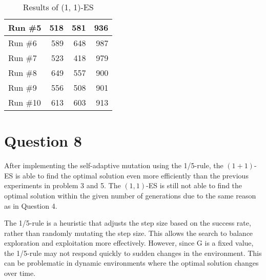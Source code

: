 \documentclass[12pt,letterpaper]{article}
\begin{document}
\begin{table}[H]
{\begin{tabular}{l|r|r|r}
            Run \#5  & 518      & 581     & 936     \\ \hline
            Run \#6  & 589      & 648     & 987     \\ \hline
            Run \#7  & 523      & 418     & 979     \\ \hline
            Run \#8  & 649      & 557     & 900     \\ \hline
            Run \#9  & 556      & 508     & 901     \\ \hline
            Run \#10 & 613      & 603     & 913     \\
        \end{tabular}
        \caption{Results of (1, 1)-ES}
        \label{tab:7b}
    }
\end{table}

\section*{Question 8}
After implementing the self-adaptive mutation using the 1/5-rule, the $(1+1)$-ES is able to find the optimal solution even more efficiently than the previous experiments in problem 3 and 5. The $(1, 1)$-ES is still not able to find the optimal solution within the given number of generations due to the same reason as in Question 4. 

The 1/5-rule is a heuristic that adjusts the step size based on the success rate, rather than randomly mutating the step size. This allows the search to balance exploration and exploitation more effectively. However, since G is a fixed value, the 1/5-rule may not respond quickly to sudden changes in the environment. This can be problematic in dynamic environments where the optimal solution changes over time.
\end{document}
